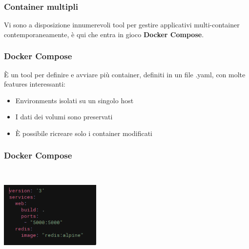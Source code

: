 \documentclass{beamer}
\begin{document}

\begin{frame}
    \frametitle{Container multipli}
    Vi sono a disposizione innumerevoli tool per gestire applicativi multi-container contemporaneamente, \`e qui che entra in gioco \textbf{Docker Compose}.
\end{frame}


\begin{frame}
    \frametitle{Docker Compose}
    \`E un tool per definire e avviare pi\`u container, definiti in un file .yaml, con molte features interessanti:
    \begin{itemize}
        \item<1-> Environments isolati su un singolo host
        \item<2-> I dati dei volumi sono preservati
        \item<3-> \`E possibile ricreare solo i container modificati
    \end{itemize}
\end{frame}


\begin{frame}
    \frametitle{Docker Compose}
    \begin{center}
        \includegraphics[width=5cm,height=5cm,keepaspectratio]{docker_compose.png}
    \end{center}
\end{frame}

\end{document}
